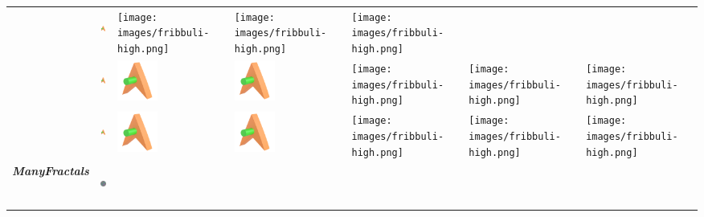 \documentclass[
  letterpaper,
  DIV=11,
  numbers=noendperiod,
  oneside]{scrreprt}
\begin{document}
\begin{longtable}[]{@{}lllllll@{}}
&
\includegraphics[width=\linewidth,height=0.52083in,keepaspectratio]{images/fribbuli-low.png}
&
\texttt{[image: images/fribbuli-high.png]}
&
\texttt{[image: images/fribbuli-high.png]}
&
\texttt{[image: images/fribbuli-high.png]} \\
&
\includegraphics[width=\linewidth,height=0.52083in,keepaspectratio]{images/fribbuli-low.png}
&
\includegraphics[width=\linewidth,height=0.52083in,keepaspectratio]{images/fribbuli-low.png}
&
\includegraphics[width=\linewidth,height=0.52083in,keepaspectratio]{images/fribbuli-low.png}
&
\texttt{[image: images/fribbuli-high.png]}
&
\texttt{[image: images/fribbuli-high.png]}
&
\texttt{[image: images/fribbuli-high.png]} \\
&
\includegraphics[width=\linewidth,height=0.52083in,keepaspectratio]{images/fribbuli-low.png}
&
\includegraphics[width=\linewidth,height=0.52083in,keepaspectratio]{images/fribbuli-low.png}
&
\includegraphics[width=\linewidth,height=0.52083in,keepaspectratio]{images/fribbuli-low.png}
&
\texttt{[image: images/fribbuli-high.png]}
&
\texttt{[image: images/fribbuli-high.png]}
&
\texttt{[image: images/fribbuli-high.png]} \\
\multirow{4}{=}{\textbf{\emph{ManyFractals}}} &
\includegraphics[width=\linewidth,height=0.52083in,keepaspectratio]{images/fractal-low.png}

\end{longtable}
\end{document}
